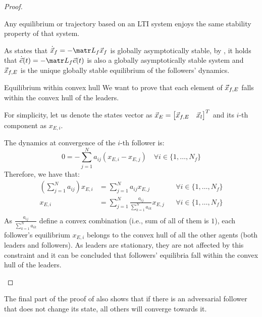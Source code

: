 \begin{theorem}
\begin{proof}
\begin{descriptionlist}
                \begin{lemma} \label{th:lti_stability_equilib_traj}
                    Any equilibrium or trajectory based on an LTI system enjoys the same stability property of that system.
                \end{lemma}

                As  states that $\dot{\x}_f = -\lap_f \x_f$ is globally asymptotically stable, by , it holds that $\dot{\vec{e}}(t) = -\lap_f \vec{e}(t)$ is also a globally asymptotically stable system and ${\vec{x}}_{f,E}$ is the unique globally stable equilibrium of the followers' dynamics.

            \item[Equilibrium within convex hull] 
                We want to prove that each element of ${\vec{x}}_{f,E}$ falls within the convex hull of the leaders.

                For simplicity, let us denote the states vector as ${\vec{x}}_E = \begin{bmatrix} {\vec{x}}_{f,E} & {\vec{x}}_l \end{bmatrix}^T$ and its $i$-th component as $x_{E,i}$.

                The dynamics at convergence of the $i$-th follower is:
                \[ 0 = - \sum_{j=1}^N a_{ij} (x_{E,i} - x_{E,j}) \quad \forall i \in \{ 1, \dots, N_f \} \]
                Therefore, we have that:
                \[
                    \begin{aligned}
                        \left( \sum_{j=1}^N a_{ij} \right) x_{E,i} &= \sum_{j=1}^N a_{ij} x_{E,j} & & \forall i \in \{ 1, \dots, N_f \} \\
                        x_{E,i} &= \sum_{j=1}^N \frac{a_{ij}}{\sum_{k=1}^N a_{ik}} x_{E,j} & & \forall i \in \{ 1, \dots, N_f \} \\
                    \end{aligned}
                \]
                As $\frac{a_{ij}}{\sum_{k=1}^N a_{ik}}$ define a convex combination (i.e., sum of all of them is $1$), each follower's equilibrium $x_{E,i}$ belongs to the convex hull of all the other agents (both leaders and followers). As leaders are stationary, they are not affected by this constraint and it can be concluded that followers' equilibria fall within the convex hull of the leaders.
        \end{descriptionlist}
    \end{proof}
\end{theorem}

\begin{remark}
    The final part of the proof of  also shows that if there is an adversarial follower that does not change its state, all others will converge towards it.
\end{remark}